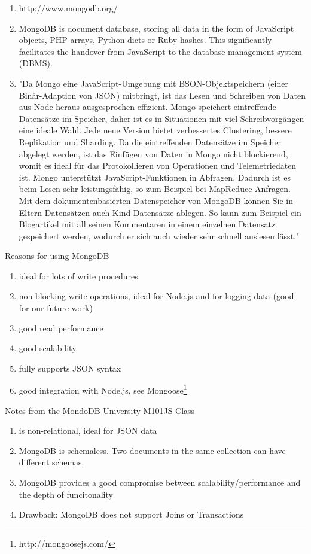 \begin{enumerate}
\item http://www.mongodb.org/
\item MongoDB is document database, storing all data in the form of JavaScript objects, PHP arrays, Python dicts or Ruby hashes. This significantly facilitates the handover from JavaScript to the database management system (DBMS).
\item "Da Mongo eine JavaScript-Umgebung mit BSON-Objektspeichern (einer Bin\"ar-Adaption von JSON) mitbringt, ist das Lesen und Schreiben von Daten aus Node heraus ausgesprochen effizient. Mongo speichert eintreffende Datens\"atze im Speicher, daher ist es in Situationen mit viel Schreibvorg\"angen eine ideale Wahl. Jede neue Version bietet verbessertes Clustering, bessere Replikation und Sharding. Da die eintreffenden Datens\"atze im Speicher abgelegt werden, ist das Einf\"ugen von Daten in Mongo nicht blockierend, womit es ideal f\"ur das Protokollieren von Operationen und Telemetriedaten ist. Mongo unterst\"utzt JavaScript-Funktionen in Abfragen. Dadurch ist es beim Lesen sehr leistungsf\"ahig, so zum Beispiel bei MapReduce-Anfragen. Mit dem dokumentenbasierten Datenspeicher von MongoDB k\"onnen Sie in Eltern-Datens\"atzen auch Kind-Datens\"atze ablegen. So kann zum Beispiel ein Blogartikel mit all seinen Kommentaren in einem einzelnen Datensatz gespeichert werden, wodurch er sich auch wieder sehr schnell auslesen l\"asst."  \cite{hughes2012einfuhrung}
\end{enumerate}

Reasons for using MongoDB
\begin{enumerate}
\item ideal for lots of write procedures
\item non-blocking write operations, ideal for Node.js and for logging data (good for our future work)
\item good read performance
\item good scalability
\item fully supports JSON syntax
\item good integration with Node.js, see Mongoose\footnote{http://mongoosejs.com/}
\end{enumerate}


Notes from the MondoDB University M101JS Class
\begin{enumerate}
\item is non-relational, ideal for JSON data
\item MongoDB is schemaless. Two documents in the same collection can have different schemas.
\item MongoDB provides a good compromise between scalability/performance and the depth of funcitonality
\item Drawback: MongoDB does not support Joins or Transactions
\end{enumerate}



